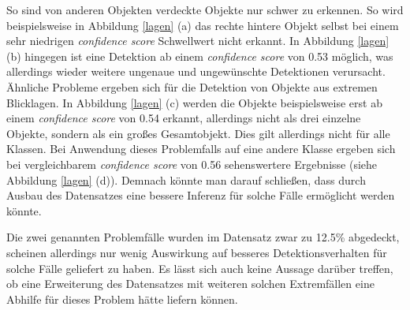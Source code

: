So sind von anderen Objekten verdeckte Objekte nur schwer zu erkennen. So wird beispielsweise in Abbildung \ref{lagen} (a) das rechte hintere Objekt selbst bei einem sehr niedrigen \textit{confidence score} Schwellwert nicht erkannt. In Abbildung \ref{lagen} (b) hingegen ist eine Detektion ab einem \textit{confidence score} von 0.53 möglich, was allerdings wieder weitere ungenaue und ungewünschte Detektionen verursacht. Ähnliche Probleme ergeben sich für die Detektion von Objekte aus extremen Blicklagen. In Abbildung \ref{lagen} (c) werden die Objekte beispielsweise erst ab einem \textit{confidence score} von 0.54 erkannt, allerdings nicht als drei einzelne Objekte, sondern als ein großes Gesamtobjekt. Dies gilt allerdings nicht für alle Klassen. Bei Anwendung dieses Problemfalls auf eine andere Klasse ergeben sich bei vergleichbarem \textit{confidence score} von 0.56 sehenswertere Ergebnisse (siehe Abbildung \ref{lagen} (d)). Demnach könnte man darauf schließen, dass durch Ausbau des Datensatzes eine bessere Inferenz für solche Fälle ermöglicht werden könnte.

Die zwei genannten Problemfälle wurden im Datensatz zwar zu 12.5\% abgedeckt, scheinen allerdings nur wenig Auswirkung auf besseres Detektionsverhalten für solche Fälle geliefert zu haben. Es lässt sich auch keine Aussage darüber treffen, ob eine Erweiterung des Datensatzes mit weiteren solchen Extremfällen eine Abhilfe für dieses Problem hätte liefern können. 

